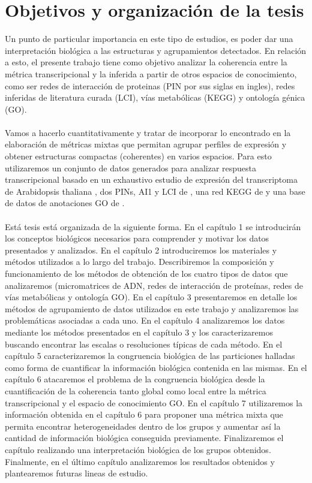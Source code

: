 \section*{Objetivos y organización de la tesis}
Un punto de particular importancia en este tipo de estudios, es poder dar una interpretación biológica a las estructuras y agrupamientos detectados. En relación a esto, el presente trabajo tiene como objetivo analizar la coherencia entre la métrica transcripcional y la inferida a partir de otros espacios de conocimiento, como ser redes de interacción de proteinas (PIN por sus siglas en ingles), redes inferidas de literatura curada (LCI), vías metabólicas (KEGG) y ontología génica (GO).\\\\
Vamos a hacerlo cuantitativamente y tratar de incorporar lo encontrado en la elaboración de métricas mixtas que permitan agrupar perfiles de expresión y obtener estructuras compactas (coherentes) en varios espacios. Para esto utilizaremos un conjunto de datos generados para analizar respuesta transcripcional basado en un exhaustivo estudio de expresión del transcriptoma de Arabidopsis thaliana \cite{Kilian2007}, dos PINs, AI1 y LCI de \cite{Hahn2013}, una red KEGG de \cite{Kanehisa2000} y una base de datos de anotaciones GO de \cite{org.At.tair.db2015}.\\\\
Está tesis está organizada de la siguiente forma. En el capítulo 1 se introducirán los conceptos biológicos necesarios para comprender y motivar los datos presentados y analizados. En el capítulo 2 introduciremos los materiales y métodos utilizados a lo largo del trabajo. Describiremos la composición y funcionamiento de los métodos de obtención de los cuatro tipos de datos que analizaremos (micromatrices de ADN, redes de interacción de proteínas, redes de vías metabólicas y ontología GO). En el capítulo 3 presentaremos en detalle los métodos de agrupamiento de datos utilizados en este trabajo y analizaremos las problemáticas asociadas a cada uno. En el capítulo 4 analizaremos los datos mediante los métodos presentados en el capítulo 3 y los caracterizaremos buscando encontrar las escalas o resoluciones típicas de cada método. En el capítulo 5 caracterizaremos la congruencia biológica de las particiones halladas como forma de cuantificar la información biológica contenida en las mismas. En el capítulo 6 atacaremos el problema de la congruencia biológica desde la cuantificación de la coherencia tanto global como local entre la métrica transcripcional y el espacio de conocimiento GO. En el capítulo 7 utilizaremos la información obtenida en el capítulo 6 para proponer una métrica mixta que permita encontrar heterogeneidades dentro de los grupos y aumentar así la cantidad de información biológica conseguida previamente. Finalizaremos el capítulo realizando una interpretación biológica de los grupos obtenidos. Finalmente, en el último capítulo analizaremos los resultados obtenidos y plantearemos futuras lineas de estudio.